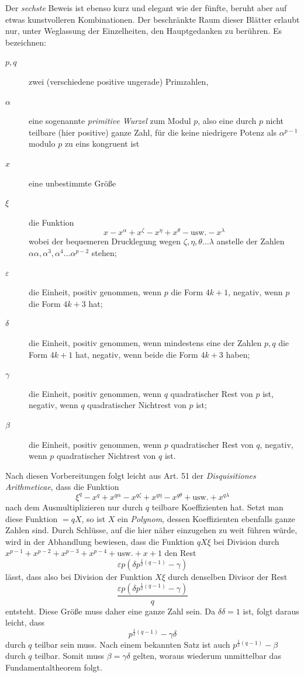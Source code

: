 Der \emph{sechste} Beweis ist ebenso kurz und elegant wie der fünfte, beruht aber auf etwas kunstvolleren Kombinationen. Der beschränkte Raum dieser Blätter erlaubt nur, unter Weglassung der Einzelheiten, den Hauptgedanken zu berühren. Es bezeichnen:
\begin{description}
\item[$p,q$] zwei (verschiedene positive ungerade) Primzahlen,
\item[$\alpha$] eine sogenannte \emph{primitive Wurzel} zum Modul $p$, also eine durch $p$ nicht teilbare (hier positive) ganze Zahl, für die keine niedrigere Potenz als $\alpha^{p-1}$ modulo $p$ zu eins kongruent ist
\item[$x$] eine unbestimmte Größe
%
\item[$\xi$] die Funktion
\[
x-x^\alpha+x^\zeta-x^\eta+x^\theta-\text{usw.}-x^\lambda
\]
wobei der bequemeren Drucklegung wegen $\zeta,\eta,\theta\ldots\lambda$ anstelle der Zahlen $\alpha\alpha,\allowbreak \alpha^3,\allowbreak \alpha^4\ldots\allowbreak \alpha^{p-2}$ stehen;
\item[$\varepsilon$] die Einheit, positiv genommen, wenn $p$ die Form $4k+1$, negativ, wenn $p$ die Form $4k+3$ hat;
\item[$\delta$] die Einheit, positiv genommen, wenn mindestens eine der Zahlen $p,q$ die Form $4k+1$ hat, negativ, wenn beide die Form $4k+3$ haben;
\item[$\gamma$] die Einheit, positiv genommen, wenn $q$ quadratischer Rest von $p$ ist, negativ, wenn $q$ quadratischer Nichtrest von $p$ ist;
\item[$\beta$] die Einheit, positiv genommen, wenn $p$ quadratischer Rest von $q$, negativ, wenn $p$ quadratischer Nichtrest von $q$ ist.
\end{description}

Nach diesen Vorbereitungen folgt leicht aus Art. 51 der \emph{Disquisitiones Arithmeticae}, dass die Funktion
\[
\xi^q-x^q+x^{q\alpha}-x^{q\zeta}+x^{q\eta}-x^{q\theta}+\text{usw.}+x^{q\lambda}
\]
nach dem Ausmultiplizieren nur durch $q$ teilbare Koeffizienten hat. Setzt man diese Funktion $=qX$, so ist $X$ ein \emph{Polynom}, dessen Koeffizienten ebenfalls ganze Zahlen sind. Durch Schlüsse, auf die hier näher einzugehen zu weit führen würde, wird in der Abhandlung bewiesen, dass die Funktion $qX\xi$ bei Division durch $x^{p-1}+x^{p-2}+x^{p-3}+x^{p-4}+\text{usw.}+x+1$ den Rest
\[
\varepsilon p(\delta p^{\frac12(q-1)}-\gamma)
\]
lässt, dass also bei Division der Funktion $X\xi$ durch denselben Divisor der Rest
\[
\frac{\varepsilon p(\delta p^{\frac12(q-1)}-\gamma)}{q}
\]
entsteht. Diese Größe muss daher eine ganze Zahl sein. Da $\delta\delta=1$ ist, folgt daraus leicht, dass
\[
p^{\frac12(q-1)}-\gamma\delta
\]
durch $q$ teilbar sein muss. Nach einem bekannten Satz ist auch $p^{\frac12(q-1)}-\beta$ durch $q$ teilbar. Somit muss $\beta=\gamma\delta$ gelten, woraus wiederum unmittelbar das Fundamentaltheorem folgt.

